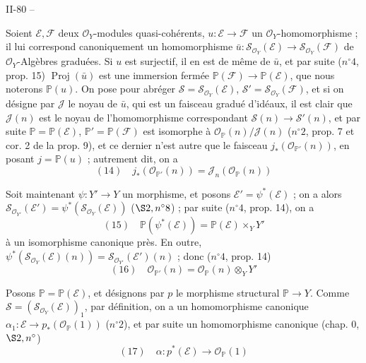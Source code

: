 \newpage



II-80 --

Soient $\mathcal{E}, \mathcal{F}$ deux $\mathcal{O}_Y$-modules quasi-cohérents, $u : \mathcal{E} \to \mathcal{F}$ un $\mathcal{O}_Y$-homomorphisme ; il lui correspond canoniquement un homomorphisme $\bar{u} : \mathcal{S}_{\mathcal{O}_Y}(\mathcal{E}) \to \mathcal{S}_{\mathcal{O}_Y}(\mathcal{F})$ de $\mathcal{O}_Y$-Algèbres graduées. Si $u$ est surjectif, il en est de même de $\bar{u}$, et par suite ($n^\circ 4$, prop. 15) $\operatorname{Proj}(\bar{u})$ est une immersion fermée $\mathbb{P}(\mathcal{F}) \to \mathbb{P}(\mathcal{E})$, que nous noterons $\mathbb{P}(u)$. On pose pour abréger $\mathcal{S}=\mathcal{S}_{\mathcal{O}_Y}(\mathcal{E})$, $\mathcal{S}'=\mathcal{S}_{\mathcal{O}_Y}(\mathcal{F})$, et si on désigne par $\mathcal{J}$ le noyau de $\bar{u}$, qui est un faisceau gradué d'idéaux, il est clair que $\mathcal{J}(n)$ est le noyau de l'homomorphisme correspondant $\mathcal{S}(n) \to \mathcal{S}'(n)$, et par suite $\mathbb{P}=\mathbb{P}(\mathcal{E})$, $\mathbb{P}'=\mathbb{P}(\mathcal{F})$ est isomorphe à $\mathcal{O}_{\mathbb{P}}(n)/\mathcal{J}(n)$ ($n^\circ 2$, prop. 7 et cor. 2 de la prop. 9), et ce dernier n'est autre que le faisceau $j_*(\mathcal{O}_{\mathbb{P}'}(n))$, en posant $j=\mathbb{P}(u)$ ; autrement dit, on a
$$(14) \quad j_*(\mathcal{O}_{\mathbb{P}'}(n)) = \mathcal{J}_n(\mathcal{O}_{\mathbb{P}}(n))$$

Soit maintenant $\psi : Y' \to Y$ un morphisme, et posons $\mathcal{E}'=\psi^*(\mathcal{E})$ ; on a alors $\mathcal{S}_{\mathcal{O}_{Y'}}(\mathcal{E}') = \psi^*(\mathcal{S}_{\mathcal{O}_Y}(\mathcal{E}))$ ($\S 2, n^\circ 8$) ; par suite ($n^\circ 4$, prop. 14), on a
$$(15) \quad \mathbb{P}(\psi^*(\mathcal{E})) = \mathbb{P}(\mathcal{E}) \times_Y Y'$$
à un isomorphisme canonique près. En outre, $\psi^*(\mathcal{S}_{\mathcal{O}_Y}(\mathcal{E})(n)) = \mathcal{S}_{\mathcal{O}_{Y'}}(\mathcal{E}')(n)$ ; donc ($n^\circ 4$, prop. 14)
$$(16) \quad \mathcal{O}_{\mathbb{P}'}(n) = \mathcal{O}_{\mathbb{P}}(n) \otimes_Y Y'$$

Posons $\mathbb{P}=\mathbb{P}(\mathcal{E})$, et désignons par $p$ le morphisme structural $\mathbb{P} \to Y$.
Comme $\mathcal{S}=(\mathcal{S}_{\mathcal{O}_Y}(\mathcal{E}))_1$, par définition, on a un homomorphisme canonique $\alpha_1 : \mathcal{E} \to p_*(\mathcal{O}_{\mathbb{P}}(1))$ ($n^\circ 2$), et par suite un homomorphisme canonique (chap. 0, $\S 2, n^\circ$)
$$(17) \quad \alpha : p^*(\mathcal{E}) \to \mathcal{O}_{\mathbb{P}}(1)$$


